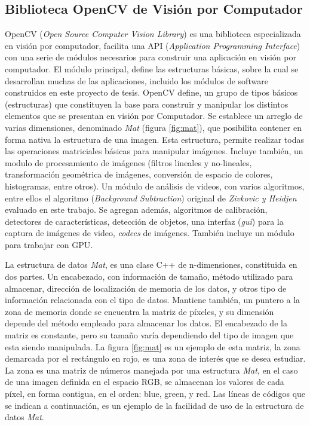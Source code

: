 \subsection{Biblioteca OpenCV de Visión por Computador}
OpenCV\cite{opencv} (\textit{Open Source Computer Vision Library}) es una biblioteca especializada en visión por computador, facilita una API (\textit{Application Programming Interface}) con una serie de módulos necesarios para construir una aplicación en visión por computador. El módulo principal, define las estructuras básicas, sobre la cual se desarrollan muchas de las aplicaciones, incluido los módulos de software construidos en este proyecto de tesis. OpenCV define, un grupo de tipos básicos (estructuras) que constituyen la base para construir y manipular los distintos elementos que se presentan en visión por Computador. Se establece un arreglo de varias dimensiones, denominado \textit{Mat} (figura \ref{fig:mat}), que posibilita contener en forma nativa la estructura de una imagen. Esta estructura, permite realizar todas las operaciones matriciales básicas para manipular imágenes. Incluye también, un modulo de procesamiento de imágenes (filtros lineales y no-lineales, transformación geométrica de imágenes, conversión de espacio de colores, histogramas, entre otros). Un módulo de análisis de videos, con varios algoritmos, entre ellos el algoritmo (\textit{Background Subtraction}) original de  \textit{Zivkovic y Heidjen} \cite{zivkovic_efficient_2006} evaluado en este trabajo.  Se agregan además, algoritmos de calibración, detectores de características, detección de objetos, una interfaz (\textit{gui}) para la captura de imágenes de video, \textit{codecs} de imágenes. También incluye un módulo para trabajar con GPU.

La estructura de datos \textit{Mat}, es una clase C++ de n-dimensiones, constituida en dos partes. Un encabezado, con información de tamaño, método utilizado para almacenar, dirección de localización de memoria de los datos, y otros tipo de información relacionada con el tipo de datos. Mantiene también, un puntero a la zona de memoria donde se encuentra la matriz de píxeles, y su dimensión depende del método empleado para almacenar los datos. El encabezado de la matriz es constante, pero su tamaño varía dependiendo del tipo de imagen que esta siendo manipulada. La figura \ref{fig:mat} es un ejemplo de esta matriz, la zona demarcada por el rectángulo en rojo, es una zona de interés que se desea estudiar. La zona es una matriz de números manejada por una estructura \textit{Mat}, en el caso de una imagen definida en el espacio RGB, se almacenan los valores de cada píxel, en forma contigua, en el orden: blue, green, y red. Las líneas de códigos que se indican a continuación, es un ejemplo de la facilidad de uso de la estructura de datos \textit{Mat}.\\

